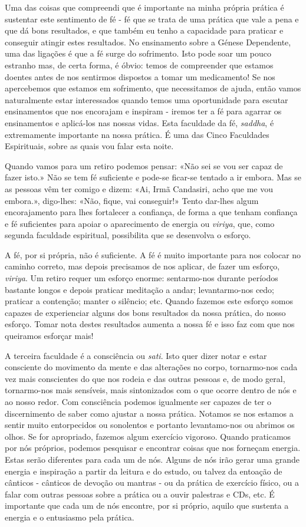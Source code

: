 Uma das coisas que compreendi que é importante na minha própria prática
é sustentar este sentimento de fé - fé que se trata de uma prática que
vale a pena e que dá bons resultados, e que também eu tenho a capacidade
para praticar e conseguir atingir estes resultados. No ensinamento sobre
a Génese Dependente, uma das ligações é que a fé surge do sofrimento.
Isto pode soar um pouco estranho mas, de certa forma, é óbvio: temos de
compreender que estamos doentes antes de nos sentirmos dispostos a tomar
um medicamento! Se nos apercebemos que estamos em sofrimento, que
necessitamos de ajuda, então vamos naturalmente estar interessados
quando temos uma oportunidade para escutar ensinamentos que nos
encorajam e inspiram - iremos ter a fé para agarrar os ensinamentos e
aplicá-los nas nossas vidas. Esta faculdade da fé, \emph{saddha}, é
extremamente importante na nossa prática. É uma das Cinco Faculdades
Espirituais, sobre as quais vou falar esta noite.

Quando vamos para um retiro podemos pensar: «Não sei se vou ser capaz de
fazer isto.» Não se tem fé suficiente e pode-se ficar-se tentado a ir
embora. Mas se as pessoas vêm ter comigo e dizem: «Ai, Irmã Candasiri,
acho que me vou embora.», digo-lhes: «Não, fique, vai conseguir!» Tento
dar-lhes algum encorajamento para lhes fortalecer a confiança, de forma
a que tenham confiança e fé suficientes para apoiar o aparecimento de
energia ou \emph{viriya}, que, como segunda faculdade espiritual,
possibilita que se desenvolva o esforço.

A fé, por si própria, não é suficiente. A fé é muito importante para nos
colocar no caminho correto, mas depois precisamos de nos aplicar, de
fazer um esforço, \emph{viriya}. Um retiro requer um esforço enorme:
sentarmo-nos durante períodos bastante longos e depois praticar
meditação a andar; levantarmo-nos cedo; praticar a contenção; manter o
silêncio; etc. Quando fazemos este esforço somos capazes de experienciar
alguns dos bons resultados da nossa prática, do nosso esforço. Tomar
nota destes resultados aumenta a nossa fé e isso faz com que nos
queiramos esforçar mais!

A terceira faculdade é a consciência ou \emph{sati}. Isto quer dizer
notar e estar consciente do movimento da mente e das alterações no
corpo, tornarmo-nos cada vez mais conscientes do que nos rodeia e das
outras pessoas e, de modo geral, tornarmo-nos mais sensíveis, mais
sintonizados com o que ocorre dentro de nós e ao nosso redor. Com
consciência podemos igualmente ser capazes de ter o discernimento de
saber como ajustar a nossa prática. Notamos se nos estamos a sentir
muito entorpecidos ou sonolentos e portanto levantamo-nos ou abrimos os
olhos. Se for apropriado, fazemos algum exercício vigoroso. Quando
praticamos por nós próprios, podemos pesquisar e encontrar coisas que
nos forneçam energia. Estas serão diferentes para cada um de nós. Alguns
de nós irão gerar uma grande energia e inspiração a partir da leitura e
do estudo, ou talvez da entoação de cânticos - cânticos de devoção ou
mantras - ou da prática de exercício físico, ou a falar com outras
pessoas sobre a prática ou a ouvir palestras e CDs, etc. É importante
que cada um de nós encontre, por si próprio, aquilo que sustenta a
energia e o entusiasmo pela prática.

